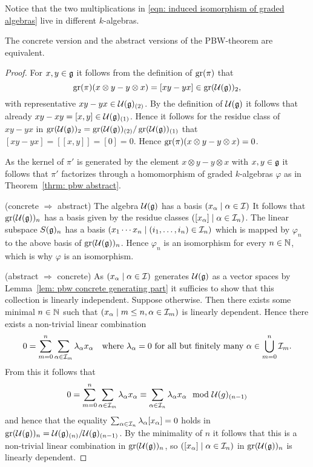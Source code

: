 \begin{rem}
 Notice that the two multiplications in \eqref{eqn: induced isomorphism of graded algebras} live in different $k$-algebras.
\end{rem}


\begin{prop}
 The concrete version and the abstract versions of the PBW-theorem are equivalent.
\end{prop}
\begin{proof}
 For $x, y \in \mathfrak{g}$ it follows from the definition of $\operatorname{gr}(\pi)$ that
 \[
  \operatorname{gr}(\pi)(x \otimes y - y \otimes x) = [xy-yx] \in \operatorname{gr}(\mathcal{U}(\mathfrak{g}))_2,
 \]
 with representative $xy-yx \in \mathcal{U}(\mathfrak{g})_{(2)}$. By the definition of $\mathcal{U}(\mathfrak{g})$ it follows that already \mbox{$xy-xy = [x,y] \in \mathcal{U}(\mathfrak{g})_{(1)}$}. Hence it follows for the residue class of $xy-yx$ in $\operatorname{gr}(\mathcal{U}(\mathfrak{g}))_2 = \operatorname{gr}(\mathcal{U}(\mathfrak{g}))_{(2)}/\operatorname{gr}(\mathcal{U}(\mathfrak{g}))_{(1)}$ that $[xy-yx] = [[x,y]] = [0] = 0$. Hence $\operatorname{gr}(\pi)(x \otimes y - y \otimes x) = 0$.
 
 As the kernel of $\pi'$ is generated by the element $x \otimes y - y \otimes x$ with $x,y \in \mathfrak{g}$ it follows that $\pi'$ factorizes through a homomorphism of graded $k$-algebras $\varphi$ as in Theorem~\ref{thrm: pbw abstract}.
 
 (concrete $\Rightarrow$ abstract) The algebra $\mathcal{U}(\mathfrak{g})$ has a basis $(x_\alpha \mid \alpha \in \mathcal{I})$ It follows that $\operatorname{gr}(\mathcal{U}(\mathfrak{g}))_n$ has a basis given by the residue classes $([x_\alpha] \mid \alpha \in \mathcal{I}_n)$. The linear subspace $S(\mathfrak{g})_n$ has a basis $(x_1 \dotsm x_n \mid (i_1, \dotsc, i_n) \in \mathcal{I}_n)$ which is mapped by $\varphi_n$ to the above basis of $\operatorname{gr}(\mathcal{U}(\mathfrak{g}))_n$. Hence $\varphi_n$ is an isomorphism for every $n \in \mathbb{N}$, which is why $\varphi$ is an isomorphism.
 
 (abstract $\Rightarrow$ concrete) As $(x_\alpha \mid \alpha \in \mathcal{I})$ generates $\mathcal{U}(\mathfrak{g})$ as a vector spaces by Lemma~\ref{lem: pbw concrete generating part} it sufficies to show that this collection is linearly independent. Suppose otherwise. Then there exists some minimal $n \in \mathbb{N}$ such that $(x_\alpha \mid m \leq n, \alpha \in \mathcal{I}_m)$ is linearly dependent. Hence there exists a non-trivial linear combination
 \[
  0 = \sum_{m=0}^n \sum_{\alpha \in \mathcal{I}_m} \lambda_\alpha x_\alpha
 \quad
 \text{where $\lambda_\alpha = 0$ for all but finitely many $\alpha \in \bigcup_{m=0}^n \mathcal{I}_m$}.
 \]
 From this it follows that
 \[
  0
  = \sum_{m=0}^n \sum_{\alpha \in \mathcal{I}_m} \lambda_\alpha x_\alpha
  \equiv \sum_{\alpha \in \mathcal{I}_n} \lambda_\alpha x_\alpha
  \mod {\mathcal{U}}(g)_{(n-1)}
 \]
 and hence that the equality $\sum_{\alpha \in \mathcal{I}_n} \lambda_\alpha [x_\alpha] = 0$ holds in $\operatorname{gr}(\mathcal{U}(\mathfrak{g}))_n = \mathcal{U}(\mathfrak{g})_{(n)}/\mathcal{U}(\mathfrak{g})_{(n-1)}$. By the minimality of $n$ it follows that this is a non-trivial linear combination in $\operatorname{gr}(\mathcal{U}(\mathfrak{g}))_n$, so $([x_\alpha] \mid \alpha \in \mathcal{I}_n)$ in $\operatorname{gr}(\mathcal{U}(\mathfrak{g}))_n$ is linearly dependent.
 

\end{proof}
